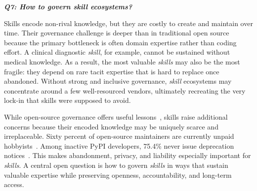\documentclass[sigconf,nonacm]{acmart}
\begin{document}

\vspace{+0.04in}
\emph{\textbf{Q7: How to govern skill ecosystems? }} %


Skills encode non-rival knowledge, but they are costly to create and maintain over time. Their governance challenge is deeper than in traditional open source because the primary bottleneck is often domain expertise rather than coding effort. A clinical diagnostic \emph{skill}, for example, cannot be sustained without medical knowledge. As a result, the most valuable \emph{skills} may also be the most fragile: they depend on rare tacit expertise that is hard to replace once abandoned. Without strong and inclusive governance, \emph{skill} ecosystems may concentrate around a few well-resourced vendors, ultimately recreating the very lock-in that skills were supposed to avoid.

While open-source governance offers useful lessons~\cite{ostrom1990commons,eghbal2016roads}, skills raise additional concerns because their encoded knowledge may be uniquely scarce and irreplaceable. Sixty percent of open-source maintainers are currently unpaid hobbyists~\cite{tidelift2024maintainer}. Among inactive PyPI developers, 75.4\% never issue deprecation notices~\cite{zhong2025deprecation}.  This makes abandonment, privacy, and liability especially important for \emph{skills}. A central open question is how to govern \emph{skills} in ways that sustain valuable expertise while preserving openness, accountability, and long-term access.
\end{document}
